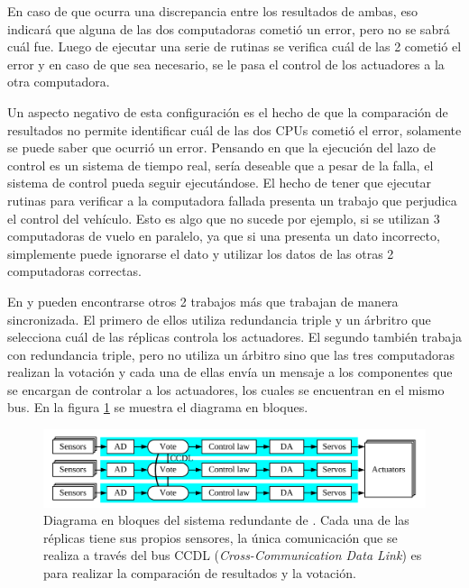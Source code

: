 En caso de que ocurra una discrepancia entre los resultados de ambas, eso indicará que alguna de las dos computadoras cometió un error, pero no se sabrá cuál fue. Luego de ejecutar una serie de rutinas se verifica cuál de las 2 cometió el error y en caso de que sea necesario, se le pasa el control de los actuadores a la otra computadora.

Un aspecto negativo de esta configuración es el hecho de que la comparación de resultados no permite identificar cuál de las dos CPUs cometió el error, solamente se puede saber que ocurrió un error. Pensando en que la ejecución del lazo de control es un sistema de tiempo real, sería deseable que a pesar de la falla, el sistema de control pueda seguir ejecutándose. El hecho de tener que ejecutar rutinas para verificar a la computadora fallada presenta un trabajo que perjudica el control del vehículo. Esto es algo que no sucede por ejemplo, si se utilizan 3 computadoras de vuelo en paralelo, ya que si una presenta un dato incorrecto, simplemente puede ignorarse el dato y utilizar los datos de las otras 2 computadoras correctas. %

En \cite{chen2015design} y \cite{wang2008development} pueden encontrarse otros 2 trabajos más que trabajan de manera sincronizada. El primero de ellos utiliza redundancia triple y un árbritro que selecciona cuál de las réplicas controla los actuadores. El segundo también trabaja con redundancia triple, pero no utiliza un árbitro sino que las tres computadoras realizan la votación y cada una de ellas envía un mensaje a los componentes que se encargan de controlar a los actuadores, los cuales se encuentran en el mismo bus. En la figura \ref{fig:RS_485_sync} se muestra el diagrama en bloques.

\begin{figure}[htb]
    \centering
    \includegraphics[width=\textwidth]{img/RS_485_sync.png}
    \caption{Diagrama en bloques del sistema redundante de \cite{wang2008development}. Cada una de las réplicas tiene sus propios sensores, la única comunicación que se realiza a través del bus CCDL (\textit{Cross-Communication Data Link}) es para realizar la comparación de resultados y la votación.}
    \label{fig:RS_485_sync}
\end{figure}

